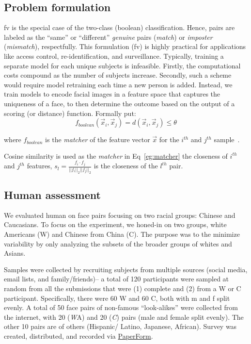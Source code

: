 \subsection{Problem formulation}\label{subsec:pf} 
\Gls{fv} is the special case of the two-class (\ie boolean) classification. Hence, pairs are labeled as the ``same'' or ``different'' \textit{genuine} pairs (\ie \textit{match}) or \textit{imposter} (\ie \textit{mismatch}), respectfully. This formulation (\ie \gls{fv}) is highly practical for applications like access control, re-identification, and surveillance. Typically, training a separate model for each unique subjects is infeasible. Firstly, the computational costs compound as the number of subjects increase.  Secondly, such a scheme would require model retraining each time a new person is added. Instead, we train models to encode facial images in a feature space that captures the uniqueness of a face, to then determine the outcome based on the output of a scoring (or distance) function. Formally put:
\begin{equation}\label{eg:matcher}
    f_{boolean}(\vec{x}_i, \vec{x}_j) = d(\vec{x}_i, \vec{x}_j) \leq \theta
\end{equation}

where $f_{boolean}$ is the \textit{matcher} of the feature vector $\vec{x}$ for the $i^{th}$ and $j^{th}$ sample~\cite{LFWTech}.

Cosine similarity is used as the \emph{matcher} in Eq~\ref{eg:matcher} the closeness of $i^{th}$ and $j^{th}$ features, \ie
$
s_l= \frac{f_i\cdot f_j}{||f_i||_2||f_j||_2}
$ is the closeness of the $l^{th}$ pair. 


\subsection{Human assessment}\label{subsec:human-assessment}
We evaluated human on face pairs focusing on two racial groups: Chinese and Caucasians. To focus on the experiment, we honed-in on two groups, white Americans (W) and Chinese from China (C). The purpose was to the minimize variability by only analyzing the subsets of the broader groups of whites and Asians. 

Samples were collected by recruiting subjects from multiple sources (\eg social media, email lists, and family/friends)-- a total of 120 participants were sampled at random from all the submissions that were (1) complete and (2) from a W or C participant. Specifically, there were 60 W and 60 C, both with \gls{m} and \gls{f} split evenly. A total of 50 face pairs of non-famous ``look-alikes'' were collected from the internet, with 20 ({\emph WA}) and 20 ({\emph C}) pairs (male and female split evenly). The other 10 pairs are of others (\eg Hispanic/ Latino, Japanese, African). Survey was created, distributed, and recorded via \href{https://paperform.co}{PaperForm}. 